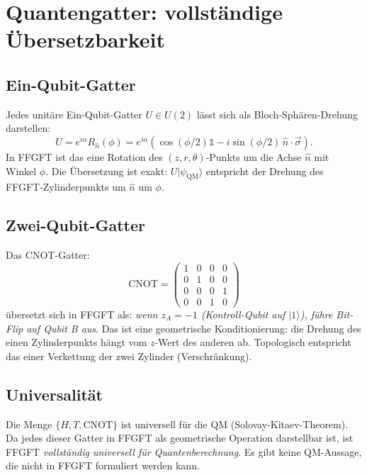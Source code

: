 \section{Quantengatter: vollständige Übersetzbarkeit}

\subsection{Ein-Qubit-Gatter}

Jedes unitäre Ein-Qubit-Gatter $U \in U(2)$ lässt sich als
Bloch-Sphären-Drehung darstellen:
\begin{equation}
  U = e^{i\alpha} R_{\hat n}(\phi)
    = e^{i\alpha}(\cos(\phi/2)\mathbb{1} - i\sin(\phi/2)\, \hat n \cdot \vec\sigma).
\end{equation}
In FFGFT ist das eine Rotation des $(z, r, \theta)$-Punkts um die Achse $\hat n$
mit Winkel $\phi$. Die Übersetzung ist exakt: $U |\psi_\text{QM}\rangle$
entspricht der Drehung des FFGFT-Zylinderpunkts um $\hat n$ um $\phi$.

\subsection{Zwei-Qubit-Gatter}

Das CNOT-Gatter:
\begin{equation}
  \text{CNOT} = \begin{pmatrix}
    1 & 0 & 0 & 0 \\
    0 & 1 & 0 & 0 \\
    0 & 0 & 0 & 1 \\
    0 & 0 & 1 & 0
  \end{pmatrix}
\end{equation}
übersetzt sich in FFGFT als: \emph{wenn $z_A = -1$ (Kontroll-Qubit
auf $|1\rangle$), führe Bit-Flip auf Qubit B aus}. Das ist eine
geometrische Konditionierung: die Drehung des einen Zylinderpunkts
hängt vom $z$-Wert des anderen ab. Topologisch entspricht das einer
Verkettung der zwei Zylinder (Verschränkung).

\subsection{Universalität}

Die Menge $\{H, T, \text{CNOT}\}$ ist universell für die QM
(Solovay-Kitaev-Theorem). Da jedes dieser Gatter in FFGFT als
geometrische Operation darstellbar ist, ist FFGFT \emph{vollständig
universell für Quantenberechnung}. Es gibt keine QM-Aussage, die
nicht in FFGFT formuliert werden kann.

